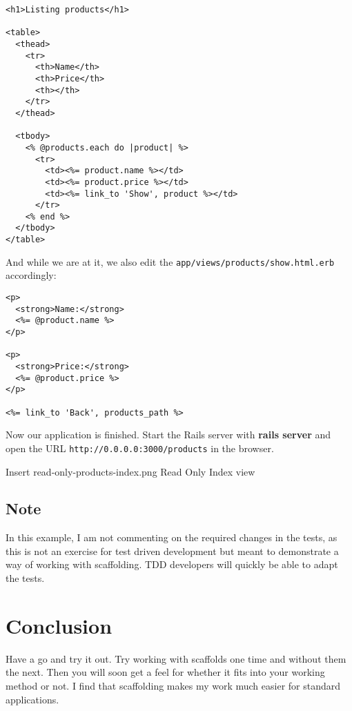 \documentclass[a4paper]{book}
\newcounter{tab}[chapter]
\begin{document}
\begin{shaded}\begin{verbatim}
<h1>Listing products</h1>

<table>
  <thead>
    <tr>
      <th>Name</th>
      <th>Price</th>
      <th></th>
    </tr>
  </thead>

  <tbody>
    <% @products.each do |product| %>
      <tr>
        <td><%= product.name %></td>
        <td><%= product.price %></td>
        <td><%= link_to 'Show', product %></td>
      </tr>
    <% end %>
  </tbody>
</table>
\end{verbatim}\end{shaded}

And while we are at it, we also edit the \texttt{app/views/products/show.html.erb} accordingly:

\begin{shaded}\begin{verbatim}
<p>
  <strong>Name:</strong>
  <%= @product.name %>
</p>

<p>
  <strong>Price:</strong>
  <%= @product.price %>
</p>

<%= link_to 'Back', products_path %>
\end{verbatim}\end{shaded}

Now our application is finished. Start the Rails server with \textbf{rails server} and open the URL \texttt{http://0.0.0.0:3000/products} in the browser.

Insert read-only-products-index.png Read Only Index view

\subsection{Note}\label{note-35}

In this example, I am not commenting on the required changes in the tests, as this is not an exercise for test driven development but meant to demonstrate a way of working with scaffolding. TDD developers will quickly be able to adapt the tests.

\section{Conclusion}\label{conclusion}

Have a go and try it out. Try working with scaffolds one time and without them the next. Then you will soon get a feel for whether it fits into your working method or not. I find that scaffolding makes my work much easier for standard applications.
\end{document}
